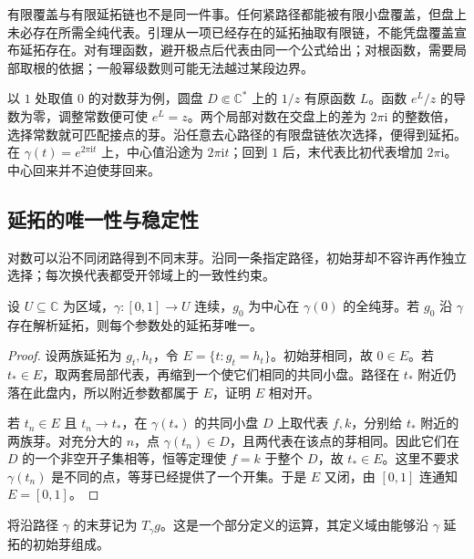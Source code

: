 \ProseParagraphBreak
有限覆盖与有限延拓链也不是同一件事。任何紧路径都能被有限小盘覆盖，但盘上未必存在所需全纯代表。引理从一项已经存在的延拓抽取有限链，不能凭盘覆盖宣布延拓存在。对有理函数，避开极点后代表由同一个公式给出；对根函数，需要局部取根的依据；一般幂级数则可能无法越过某段边界。

\ProseParagraphBreak
以 \(1\) 处取值 \(0\) 的对数芽为例，圆盘 \(D\Subset\mathbb C^*\) 上的 \(1/z\) 有原函数 \(L\)。函数 \(e^L/z\) 的导数为零，调整常数便可使 \(e^L=z\)。两个局部对数在交盘上的差为 \(2\pi\mathrm i\) 的整数倍，选择常数就可匹配接点的芽。沿任意去心路径的有限盘链依次选择，便得到延拓。在 \(\gamma(t)=e^{2\pi\mathrm i t}\) 上，中心值沿途为 \(2\pi\mathrm i t\)；回到 \(1\) 后，末代表比初代表增加 \(2\pi\mathrm i\)。中心回来并不迫使芽回来。

\subsection{延拓的唯一性与稳定性}
\label{b3:subsec:090203}

对数可以沿不同闭路得到不同末芽。沿同一条指定路径，初始芽却不容许再作独立选择；每次换代表都受开邻域上的一致性约束。

\begin{lemma}\label{b3:lem:09-continuation-unique}
设 \(U\subseteq\mathbb C\) 为区域，\(\gamma:[0,1]\to U\) 连续，\(g_0\) 为中心在 \(\gamma(0)\) 的全纯芽。若 \(g_0\) 沿 \(\gamma\) 存在解析延拓，则每个参数处的延拓芽唯一。
\end{lemma}
\begin{proof}
设两族延拓为 \(g_t,h_t\)，令 \(E=\{t:g_t=h_t\}\)。初始芽相同，故 \(0\in E\)。若 \(t_*\in E\)，取两套局部代表，再缩到一个使它们相同的共同小盘。路径在 \(t_*\) 附近仍落在此盘内，所以附近参数都属于 \(E\)，证明 \(E\) 相对开。

若 \(t_n\in E\) 且 \(t_n\to t_*\)，在 \(\gamma(t_*)\) 的共同小盘 \(D\) 上取代表 \(f,k\)，分别给 \(t_*\) 附近的两族芽。对充分大的 \(n\)，点 \(\gamma(t_n)\in D\)，且两代表在该点的芽相同。因此它们在 \(D\) 的一个非空开子集相等，恒等定理使 \(f=k\) 于整个 \(D\)，故 \(t_*\in E\)。这里不要求 \(\gamma(t_n)\) 是不同的点，等芽已经提供了一个开集。于是 \(E\) 又闭，由 \([0,1]\) 连通知 \(E=[0,1]\)。
\end{proof}
将沿路径 \(\gamma\) 的末芽记为 \(T_\gamma g\)。这是一个部分定义的运算，其定义域由能够沿 \(\gamma\) 延拓的初始芽组成。

